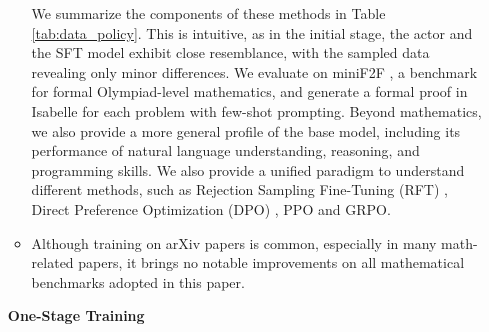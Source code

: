 \begin{itemize}[topsep=0pt]
\begin{itemize}[topsep=0pt]

We summarize the components of these methods in Table \ref{tab:data_policy}. This is intuitive, as in the initial stage, the actor and the SFT model exhibit close resemblance, with the sampled data revealing only minor differences. We evaluate on miniF2F \citep{minif2f}, a benchmark for formal Olympiad-level mathematics, and generate a formal proof in Isabelle for each problem with few-shot prompting. Beyond mathematics, we also provide a more general profile of the base model, including its performance of natural language understanding, reasoning, and programming skills. We also provide a unified paradigm to understand different methods, such as Rejection Sampling Fine-Tuning (RFT) \citep{yuan2023scaling}, Direct Preference Optimization (DPO) \citep{dpo}, PPO and GRPO. \item Although training on arXiv papers is common, especially in many math-related papers, it brings no notable improvements on all mathematical benchmarks adopted in this paper. \end{itemize}

\textbf{One-Stage Training}


\end{itemize}
